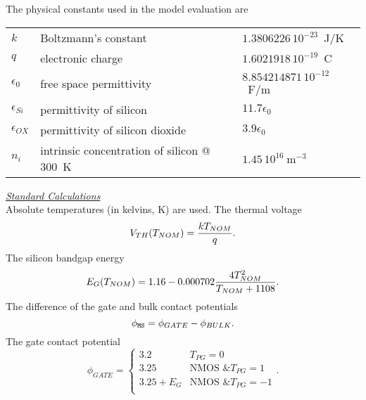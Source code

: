 \documentclass{article}
\newcommand{\TPG}{T_{PG}}
\begin{document}
The physical constants used in the model evaluation are
\begin{center}
\begin{tabular}{|l|l|l|}
\hline
$k$ & Boltzmann's constant           &  $1.3806226\,10^{-23}$~J/K\\
$q$ & electronic charge             & $1.6021918\,10^{-19}$~C\\
$\epsilon_0$& free space permittivity &  $8.854214871\,10^{-12}$~F/m\\
$\epsilon_{Si}$& permittivity of silicon &  $11.7 \epsilon_0$\\
$\epsilon_{OX}$& permittivity of silicon dioxide &  $3.9 \epsilon_0$\\
$n_i$&intrinsic concentration of silicon @ 300~K& $1.45\,10^{16}~\mbox{m}^{-3}$\\
\hline
\end{tabular}
\end{center}

\vfill
\noindent\underline{\sl \large Standard Calculations}\\[0.1in]
Absolute temperatures (in kelvins, K) are used. The thermal
voltage
\begin{equation}
V_{TH}(T_{NOM}) = {{kT_{NOM}} \over q} .
\end{equation}
\noindent The silicon bandgap energy
\begin{equation}
E_G(T_{NOM})=1.16 - 0.000702{{4T_{NOM}^2} \over {T_{NOM}+1108}} .
\end{equation}
The difference of the gate and bulk contact potentials
\begin{equation}
\phi_{\tt{MS}} = \phi_{GATE} - \phi_{BULK} .
\end{equation}
The gate contact potential
\begin{equation}
\phi_{GATE} = \left\{ \begin{array}{ll}
        3.2 & \mbox{$\TPG = 0$}\\
        3.25& \mbox{NMOS \& $\TPG = 1$}\\
        3.25 + E_G     & \mbox{NMOS \& $\TPG = -1$}\\
        \end{array} \right. .
\end{equation}
\end{document}
